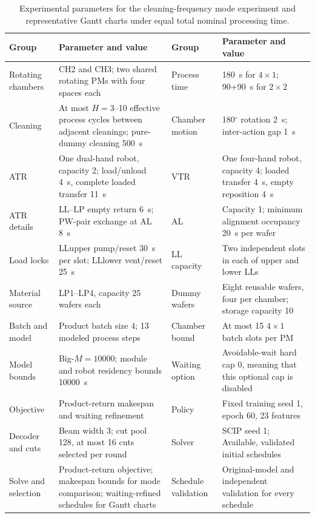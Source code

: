 \documentclass[journal]{IEEEtran}
\begin{document}
\begin{table}[!htbp]
\centering
\footnotesize
\setlength{\tabcolsep}{2pt}
\caption{Experimental parameters for the cleaning-frequency mode experiment and representative Gantt charts under equal total nominal processing time.}
\label{tab:gantt-config-en}
\begin{tabular}{C{0.10\textwidth} C{0.29\textwidth} C{0.10\textwidth} C{0.29\textwidth}}
\toprule
Group & Parameter and value & Group & Parameter and value\\
\midrule
Rotating chambers & CH2 and CH3; two shared rotating PMs with four spaces each & Process time & 180~s for $4\times1$; 90+90~s for $2\times2$\\
Cleaning & At most $H=3$--10 effective process cycles between adjacent cleanings; pure-dummy cleaning 500~s & Chamber motion & 180$^\circ$ rotation 2~s; inter-action gap 1~s\\
ATR & One dual-hand robot, capacity 2; load/unload 4~s, complete loaded transfer 11~s & VTR & One four-hand robot, capacity 4; loaded transfer 4~s, empty reposition 4~s\\
ATR details & LL--LP empty return 6~s; PW-pair exchange at AL 8~s & AL & Capacity 1; minimum alignment occupancy 20~s per wafer\\
Load locks & LLupper pump/reset 30~s per slot; LLlower vent/reset 25~s & LL capacity & Two independent slots in each of upper and lower LLs\\
Material source & LP1--LP4, capacity 25 wafers each & Dummy wafers & Eight reusable wafers, four per chamber; storage capacity 10\\
Batch and model & Product batch size 4; 13 modeled process steps & Chamber bound & At most 15 $4\times1$ batch slots per PM\\
Model bounds & Big-$M=10000$; module and robot residency bounds 10000~s & Waiting option & Avoidable-wait hard cap 0, meaning that this optional cap is disabled\\
Objective & Product-return makespan and waiting refinement & Policy & Fixed training seed 1, epoch 60, 23 features\\
Decoder and cuts & Beam width 3; cut pool 128, at most 16 cuts selected per round & Solver & SCIP seed 1; Available, validated initial schedules\\
Solve and selection & Product-return objective; makespan bounds for mode comparison; waiting-refined schedules for Gantt charts & Schedule validation & Original-model and independent validation for every schedule\\
\bottomrule
\end{tabular}
\end{table}
\end{document}
